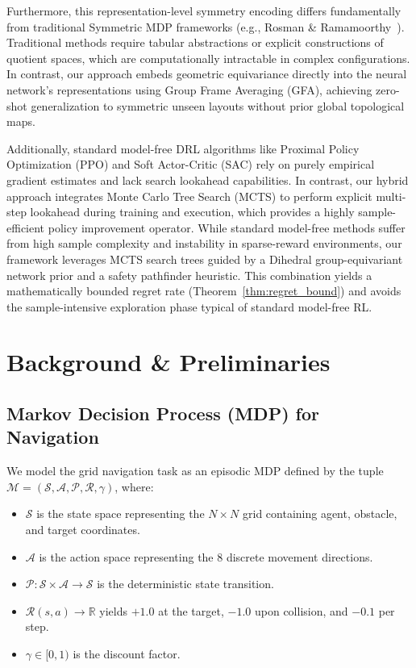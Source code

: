 \documentclass{article}
\begin{document}
Furthermore, this representation-level symmetry encoding differs fundamentally from traditional Symmetric MDP frameworks (e.g., Rosman \& Ramamoorthy~\cite{rosman2011learning}). Traditional methods require tabular abstractions or explicit constructions of quotient spaces, which are computationally intractable in complex configurations. In contrast, our approach embeds geometric equivariance directly into the neural network's representations using Group Frame Averaging (GFA), achieving zero-shot generalization to symmetric unseen layouts without prior global topological maps.

Additionally, standard model-free DRL algorithms like Proximal Policy Optimization (PPO) and Soft Actor-Critic (SAC) rely on purely empirical gradient estimates and lack search lookahead capabilities. In contrast, our hybrid approach integrates Monte Carlo Tree Search (MCTS) to perform explicit multi-step lookahead during training and execution, which provides a highly sample-efficient policy improvement operator. While standard model-free methods suffer from high sample complexity and instability in sparse-reward environments, our framework leverages MCTS search trees guided by a Dihedral group-equivariant network prior and a safety pathfinder heuristic. This combination yields a mathematically bounded regret rate (Theorem~\ref{thm:regret_bound}) and avoids the sample-intensive exploration phase typical of standard model-free RL.

\section{Background \& Preliminaries}

\subsection{Markov Decision Process (MDP) for Navigation}
We model the grid navigation task as an episodic MDP defined by the tuple $\mathcal{M} = (\mathcal{S}, \mathcal{A}, \mathcal{P}, \mathcal{R}, \gamma)$, where:
\begin{itemize}
    \item $\mathcal{S}$ is the state space representing the $N \times N$ grid containing agent, obstacle, and target coordinates.
    \item $\mathcal{A}$ is the action space representing the 8 discrete movement directions.
    \item $\mathcal{P}: \mathcal{S} \times \mathcal{A} \to \mathcal{S}$ is the deterministic state transition.
    \item $\mathcal{R}(s, a) \to \mathbb{R}$ yields $+1.0$ at the target, $-1.0$ upon collision, and $-0.1$ per step.
    \item $\gamma \in [0, 1)$ is the discount factor.
\end{itemize}
\end{document}
